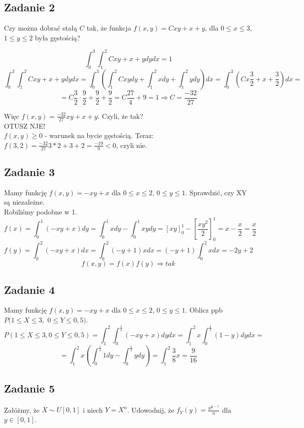 \documentclass[a4paper]{article}
\begin{document}
\begin{enumerate}[(a)]
\subsection*{Zadanie 2}
Czy można dobrać stałą $C$ tak, że funkcja $f(x,y)=Cxy+x+y$, dla $0\leq x \leq 3$, $1\leq y \leq 2$ była gęstością?

$$\int_0^3 \int_1^2 Cxy+x+y dy dx = 1$$
$$\int_0^3 \int_1^2 Cxy+x+y dy dx = \int_0^3 \left( \int_1^2 Cxy dy + \int_1^2x dy + \int_1^2 y dy \right) dx =  \int_0^3 \left( Cx\frac{3}{2} + x + \frac{3}{2} \right) dx =$$ $$=C\frac{3}{2}\cdot \frac{9}{2} +\frac{9}{2} + \frac{9}{2} = C\frac{27}{4} +9=1 \Rightarrow C=\frac{-32}{27} $$

Więc $f(x,y)=\frac{-32}{27}xy+x+y$. Czyli, że tak?\\
OTUSZ NJE!\\
$f(x,y)\geq 0$ - warunek na bycie gęstością. Teraz:\\
$f(3,2)=\frac{-32}{27}3*2+3+2=\frac{-19}{9}<0$, czyli nie.

\subsection*{Zadanie 3}
Mamy funkcję $f(x,y)=-xy+x$ dla $0\leq x\leq 2$, $0\leq y \leq 1$. Sprawdzić, czy XY są niezależne.\\
Robiliśmy podobne w 1.
$$f(x)=\int_0^1 (-xy+x)dy = \int_0^1xdy - \int_0^1 xydy = \left[ xy\right]_0^1 - \left[\frac{xy^2}{2}\right]_0^1=x-\frac{x}{2}=\frac{x}{2} $$
$$f(y)=\int_0^2(-xy + x)dx = \int_0^2(-y+1)x dx = (-y+1)\int_0^2x dx   =-2y+2$$
$$f(x,y)=f(x)f(y)\Rightarrow tak $$

\subsection*{Zadanie 4}
Mamy funkcję $f(x,y)=-xy+x$ dla $0\leq x\leq 2$, $0\leq y \leq 1$. Oblicz ppb $P(1\leq X\leq 3,$ $0\leq Y\leq 0,5)$.
$$P(1\leq X\leq 3,0\leq Y\leq 0,5) = \int_1^2 \int_0^{\frac{1}{2}} (-xy+x) dy dx = \int_1^2 x \int_0^{\frac{1}{2}} (1-y) dy dx =$$ 
$$= \int_1^2 x \left( \int_0^{\frac{1}{2}} 1 dy - \int_0^{\frac{1}{2}} y dy \right) = \int_1^2 \frac{3}{8}x =  \frac{9}{16}$$

\subsection*{Zadanie 5}
Załóżmy, że $X \sim U[0,1]$ i niech $Y=X^n$. Udowodnij, że $f_Y(y)=\frac{y^{\frac{1}{n}-1}}{n}$ dla $y\in [0,1]$.


\end{enumerate}
\end{document}
